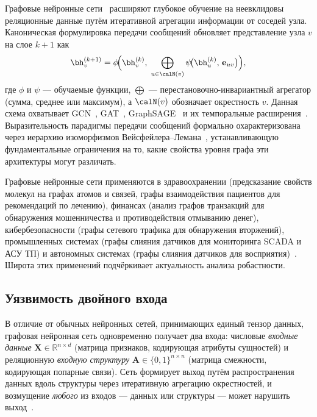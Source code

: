 Графовые нейронные сети~\cite{Kipf2017,Velickovic2018,Hamilton2017} расширяют глубокое обучение на неевклидовы реляционные данные путём итеративной агрегации информации от соседей узла. Каноническая формулировка передачи сообщений обновляет представление узла $v$ на слое $k+1$ как
\begin{equation}
\bh_v^{(k+1)}
= \phi\!\Bigl(\bh_v^{(k)},\;
  \bigoplus_{u\in\calN(v)}
    \psi\!\bigl(\bh_u^{(k)},\, \mathbf{e}_{uv}\bigr)\Bigr),
\label{eq:ch1_mp}
\end{equation}
где $\phi$ и $\psi$ --- обучаемые функции, $\bigoplus$ --- перестановочно-инвариантный агрегатор (сумма, среднее или максимум), а $\calN(v)$ обозначает окрестность $v$. Данная схема охватывает GCN~\cite{Kipf2017}, GAT~\cite{Velickovic2018}, GraphSAGE~\cite{Hamilton2017} и их темпоральные расширения~\cite{Xu2020tgat,Rossi2020,Pei2020tgn,Kazemi2020,Schlichtkrull2018}. Выразительность парадигмы передачи сообщений формально охарактеризована через иерархию изоморфизмов Вейсфейлера--Лемана~\cite{Xu2019gin}, устанавливающую фундаментальные ограничения на то, какие свойства уровня графа эти архитектуры могут различать.

Графовые нейронные сети применяются в здравоохранении (предсказание свойств молекул на графах атомов и связей, графы взаимодействия пациентов для рекомендаций по лечению), финансах (анализ графов транзакций для обнаружения мошенничества и противодействия отмыванию денег), кибербезопасности (графы сетевого трафика для обнаружения вторжений), промышленных системах (графы слияния датчиков для мониторинга SCADA и АСУ ТП) и автономных системах (графы слияния датчиков для восприятия)~\cite{Goodfellow2014gan,Gilmer2017,Gilmer2018,Ying2021,Wu2021,Luo2021}. Широта этих применений подчёркивает актуальность анализа робастности.


\subsection{Уязвимость двойного входа}

В отличие от обычных нейронных сетей, принимающих единый тензор данных, графовая нейронная сеть одновременно получает два входа: числовые \emph{входные данные} $\mathbf{X}\in\mathbb{R}^{n\times d}$ (матрица признаков, кодирующая атрибуты сущностей) и реляционную \emph{входную структуру} $\mathbf{A}\in\{0,1\}^{n\times n}$ (матрица смежности, кодирующая попарные связи). Сеть формирует выход путём распространения данных вдоль структуры через итеративную агрегацию окрестностей, и возмущение \emph{любого} из входов --- данных или структуры --- может нарушить выход~\cite{Zuegner2018,Bojchevski2019,Dai2018}.

